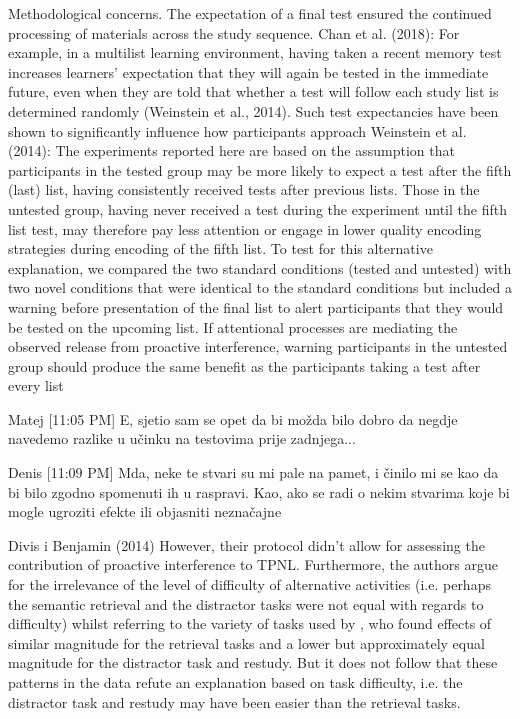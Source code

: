 \documentclass[../main.tex]{subfiles}
\begin{document}
Methodological concerns. The expectation of a final test ensured the
continued processing of materials across the study sequence.
Chan et al. (2018): %
For example, in a multilist learning environment, having taken a
recent memory test increases learners’ expectation that they will
again be tested in the immediate future, even when they are told
that whether a test will follow each study list is determined
randomly (Weinstein et al., 2014). Such test expectancies have
been shown to significantly influence how participants approach
Weinstein et al. (2014):
The experiments reported here are based on the assumption that
participants in the tested group may be more likely to expect a test
after the fifth (last) list, having consistently received tests after
previous lists. Those in the untested group, having never received
a test during the experiment until the fifth list test, may therefore
pay less attention or engage in lower quality encoding strategies
during encoding of the fifth list. To test for this alternative explanation, 
we compared the two standard conditions (tested and
untested) with two novel conditions that were identical to the
standard conditions but included a warning before presentation of
the final list to alert participants that they would be tested on the
upcoming list. If attentional processes are mediating the observed
release from proactive interference, warning participants in the
untested group should produce the same benefit as the participants
taking a test after every list


Matej [11:05 PM]
E, sjetio sam se opet da bi možda bilo dobro da negdje navedemo razlike u učinku na testovima prije zadnjega...

Denis [11:09 PM]
Mda, neke te stvari su mi pale na pamet, i činilo mi se kao da bi bilo zgodno spomenuti ih u raspravi. Kao, ako se radi o nekim stvarima koje bi mogle ugroziti efekte ili objasniti neznačajne









Divis i Benjamin (2014)
However, their protocol didn't allow for assessing the contribution of proactive interference to TPNL. Furthermore, the authors argue for the irrelevance of the level of difficulty of alternative activities (i.e. perhaps the semantic retrieval and the distractor tasks were not equal with regards to difficulty) whilst referring to the variety of tasks used by \cite{pastotterRetrievalLearningFacilitates2011}, who found effects of similar magnitude for the retrieval tasks and a lower but approximately equal magnitude for the distractor task and restudy. But it does not follow that these patterns in the data refute an explanation based on task difficulty, i.e. the distractor task and restudy may have been easier than the retrieval tasks. 
\end{document}
